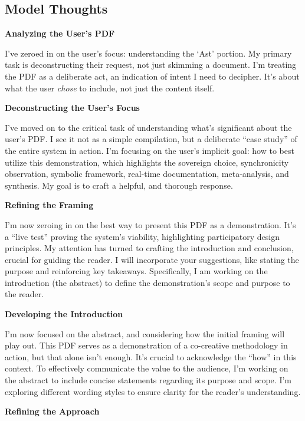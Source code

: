 \documentclass{article}
\begin{document}
\medskip

\subsection*{Model Thoughts}\label{model-thoughts}

\textbf{Analyzing the User's PDF}

I've zeroed in on the user's focus: understanding the `Ast' portion. My
primary task is deconstructing their request, not just skimming a
document. I'm treating the PDF as a deliberate act, an indication of
intent I need to decipher. It's about what the user \emph{chose} to
include, not just the content itself.

\textbf{Deconstructing the User's Focus}

I've moved on to the critical task of understanding what's significant
about the user's PDF. I see it not as a simple compilation, but a
deliberate ``case study'' of the entire system in action. I'm focusing
on the user's implicit goal: how to best utilize this demonstration,
which highlights the sovereign choice, synchronicity observation,
symbolic framework, real-time documentation, meta-analysis, and
synthesis. My goal is to craft a helpful, and thorough response.

\textbf{Refining the Framing}

I'm now zeroing in on the best way to present this PDF as a
demonstration. It's a ``live test'' proving the system's viability,
highlighting participatory design principles. My attention has turned to
crafting the introduction and conclusion, crucial for guiding the
reader. I will incorporate your suggestions, like stating the purpose
and reinforcing key takeaways. Specifically, I am working on the
introduction (the abstract) to define the demonstration's scope and
purpose to the reader.

\textbf{Developing the Introduction}

I'm now focused on the abstract, and considering how the initial framing
will play out. This PDF serves as a demonstration of a co-creative
methodology in action, but that alone isn't enough. It's crucial to
acknowledge the ``how'' in this context. To effectively communicate the
value to the audience, I'm working on the abstract to include concise
statements regarding its purpose and scope. I'm exploring different
wording styles to ensure clarity for the reader's understanding.

\textbf{Refining the Approach}
\end{document}
